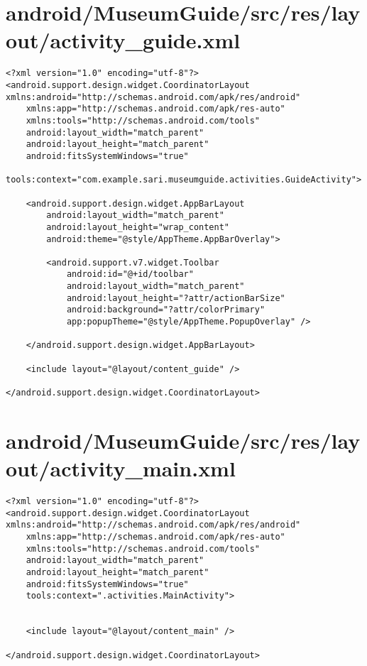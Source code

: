 \section{android/MuseumGuide/src/res/layout/activity\_guide.xml}
\begin{lstlisting}<?xml version="1.0" encoding="utf-8"?>
<android.support.design.widget.CoordinatorLayout xmlns:android="http://schemas.android.com/apk/res/android"
    xmlns:app="http://schemas.android.com/apk/res-auto"
    xmlns:tools="http://schemas.android.com/tools"
    android:layout_width="match_parent"
    android:layout_height="match_parent"
    android:fitsSystemWindows="true"
    tools:context="com.example.sari.museumguide.activities.GuideActivity">

    <android.support.design.widget.AppBarLayout
        android:layout_width="match_parent"
        android:layout_height="wrap_content"
        android:theme="@style/AppTheme.AppBarOverlay">

        <android.support.v7.widget.Toolbar
            android:id="@+id/toolbar"
            android:layout_width="match_parent"
            android:layout_height="?attr/actionBarSize"
            android:background="?attr/colorPrimary"
            app:popupTheme="@style/AppTheme.PopupOverlay" />

    </android.support.design.widget.AppBarLayout>

    <include layout="@layout/content_guide" />

</android.support.design.widget.CoordinatorLayout>
\end{lstlisting}
\newpage
\section{android/MuseumGuide/src/res/layout/activity\_main.xml}
\begin{lstlisting}<?xml version="1.0" encoding="utf-8"?>
<android.support.design.widget.CoordinatorLayout xmlns:android="http://schemas.android.com/apk/res/android"
    xmlns:app="http://schemas.android.com/apk/res-auto"
    xmlns:tools="http://schemas.android.com/tools"
    android:layout_width="match_parent"
    android:layout_height="match_parent"
    android:fitsSystemWindows="true"
    tools:context=".activities.MainActivity">


    <include layout="@layout/content_main" />

</android.support.design.widget.CoordinatorLayout>
\end{lstlisting}
\newpage
